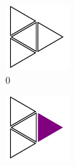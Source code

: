 \documentclass{article}
\begin{document}
\begin{figure}[H]
     \centering
     \hfill
     \begin{subfigure}[b]{0.1\textwidth}
         \centering
         \includegraphics[width=\textwidth]{graphics/introduction/configurations/c0.pdf}
         \caption*{0}
     \end{subfigure}
     \hfill
     \begin{subfigure}[b]{0.1\textwidth}
         \centering
         \includegraphics[width=\textwidth]{graphics/introduction/configurations/c1.pdf}

\end{subfigure}
\end{figure}
\end{document}

